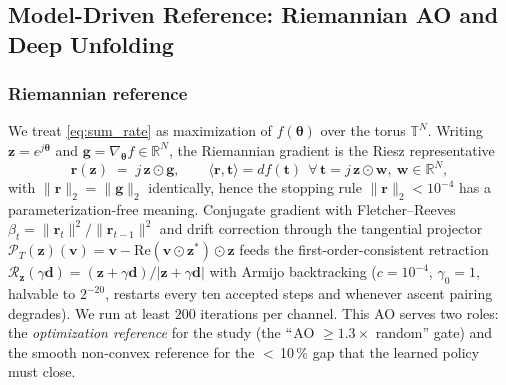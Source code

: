 \subsection{Model-Driven Reference: Riemannian AO and Deep Unfolding}\label{sec:unfolding}

\subsubsection{Riemannian reference}
We treat \eqref{eq:sum_rate} as maximization of $f(\boldsymbol\theta)$ over the
torus $\mathbb T^N$. Writing $\mathbf z = e^{j\boldsymbol\theta}$ and
$\mathbf g = \nabla_{\!\boldsymbol\theta} f \in \mathbb R^N$, the Riemannian
gradient is the Riesz representative
\begin{equation}\label{eq:rgrad}
\mathbf r(\mathbf z) \;=\; j\, \mathbf z \odot \mathbf g,
\qquad
\langle \mathbf r, \mathbf t\rangle = df(\mathbf t)
\ \ \forall\, \mathbf t = j\,\mathbf z\odot \mathbf w,\ \mathbf w\in\mathbb R^N,
\end{equation}
with $\|\mathbf r\|_2 = \|\mathbf g\|_2$ identically, hence the stopping rule
$\|\mathbf r\|_2 < 10^{-4}$ has a parameterization-free meaning. Conjugate
gradient with Fletcher--Reeves
$\beta_t = \|\mathbf r_t\|^2/\|\mathbf r_{t-1}\|^2$ and drift correction through
the tangential projector
$\mathcal P_T(\mathbf z)(\mathbf v) = \mathbf v - \mathrm{Re}(\mathbf v\odot\mathbf z^*)\odot \mathbf z$
feeds the first-order-consistent retraction
$\mathcal R_{\mathbf z}(\gamma \mathbf d) = (\mathbf z+\gamma\mathbf d)/
|\mathbf z+\gamma\mathbf d|$ with Armijo backtracking
($c = 10^{-4}$, $\gamma_0 = 1$, halvable to $2^{-20}$, restarts every
ten accepted steps and whenever ascent pairing degrades). We run at least
$200$ iterations per channel. This AO serves two roles: the
\emph{optimization reference} for the study (the $``$AO $\geq 1.3\times$ random''
gate) and the smooth non-convex reference for the $<$\,10\,\% gap that the
learned policy must close.

